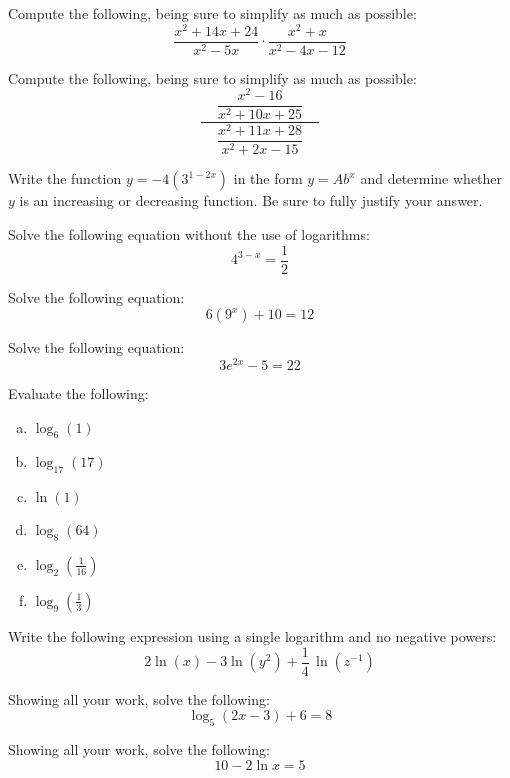 \documentclass[12pt,letterpaper]{exam}
\begin{document}
\begin{questions}
\newpage
\question[6] Compute the following, being sure to simplify as much as possible:
	\[
	\dfrac{x^2 + 14x + 24}{x^2 - 5x} \cdot \dfrac{x^2 + x}{x^2 - 4x - 12}
	\]



\newpage
\question[7] Compute the following, being sure to simplify as much as possible:
	\[
	\dfrac{\phantom{.}\;\;\;\dfrac{x^2 - 16}{x^2 + 10x + 25}\;\;\;\phantom{.}}{\dfrac{x^2 + 11x + 28}{x^2 + 2x - 15}}
	\]



\newpage
\question[6] Write the function $y= -4(3^{1 - 2x})$ in the form $y= Ab^x$ and determine whether $y$ is an increasing or decreasing function. Be sure to fully justify your answer. 



\newpage
\question[6] Solve the following equation without the use of logarithms:
	\[
	4^{3 - x}= \dfrac{1}{2}
	\]



\newpage
\question[6] Solve the following equation:
	\[
	6(9^x) + 10= 12
	\]



\newpage
\question[7] Solve the following equation:
	\[
	3e^{2x} - 5= 22
	\]



\newpage
\question[6] Evaluate the following:
	\begin{enumerate}[(a)]
	\item $\log_6(1)$
	\item $\log_{17}(17)$
	\item $\ln(1)$
	\item $\log_8(64)$
	\item $\log_2(\frac{1}{16})$
	\item $\log_9(\frac{1}{3})$
	\end{enumerate}



\newpage
\question[6] Write the following expression using a single logarithm and no negative powers:
	\[
	2 \ln(x) - 3 \ln(y^2) + \dfrac{1}{4}\,\ln(z^{-1})
	\]



\newpage
\question[6] Showing all your work, solve the following:
	\[
	\log_5(2x - 3) + 6= 8
	\]



\newpage
\question[7] Showing all your work, solve the following:
	\[
	10 - 2\ln x= 5
	\]


\end{questions}
\end{document}
